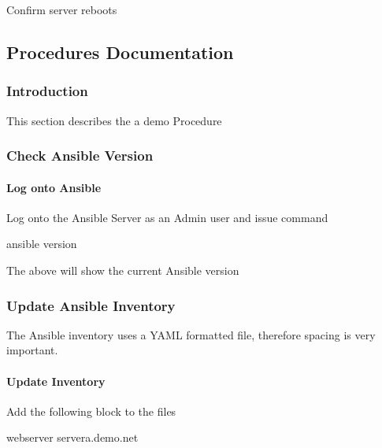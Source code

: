 \documentclass[letterpaper,10pt,english]{sphinxmanual}
\begin{document}
\sphinxAtStartPar
{} Confirm server reboots


\subsection{Procedures Documentation}
\label{\detokenize{procedures:procedures-documentation}}\label{\detokenize{procedures::doc}}

\subsubsection{Introduction}
\label{\detokenize{procedures:introduction}}
\sphinxAtStartPar
This section describes the a demo Procedure


\subsubsection{Check Ansible Version}
\label{\detokenize{procedures:check-ansible-version}}

\paragraph{Log onto Ansible}
\label{\detokenize{procedures:log-onto-ansible}}
\sphinxAtStartPar
Log onto the Ansible Server as an Admin user and issue command

\begin{sphinxVerbatim}[commandchars=\\\{\}]
ansible \PYGZhy{}\PYGZhy{}version
\end{sphinxVerbatim}

\sphinxAtStartPar
The above will show the current Ansible version


\subsubsection{Update Ansible Inventory}
\label{\detokenize{procedures:update-ansible-inventory}}
\sphinxAtStartPar
The Ansible inventory uses a YAML formatted file, therefore spacing is very important.


\paragraph{Update Inventory}
\label{\detokenize{procedures:update-inventory}}
\sphinxAtStartPar
Add the following block to the  files

\begin{sphinxVerbatim}[commandchars=\\\{\}]
\PYG{o}{[}webserver\PYG{o}{]}
servera.demo.net
\end{sphinxVerbatim}
\end{document}
